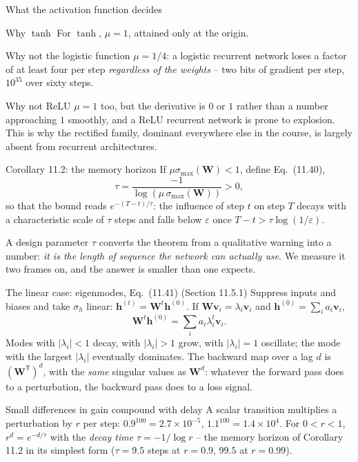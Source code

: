 \documentclass[10pt,aspectratio=169]{beamer}
\begin{document}
\begin{frame}{What the activation function decides}
\begin{block}{Why $\tanh$}
For $\tanh$, $\mu=1$, attained only at the origin.
\end{block}
\begin{block}{Why not the logistic function}
$\mu=1/4$: a logistic recurrent network loses a factor of at least four per
step \emph{regardless of the weights} -- two bits of gradient per step,
$10^{35}$ over sixty steps.
\end{block}
\begin{block}{Why not ReLU}
$\mu=1$ too, but the derivative is $0$ or $1$ rather than a number
approaching $1$ smoothly, and a ReLU recurrent network is prone to
explosion.  This is why the rectified family, dominant everywhere else in
the course, is largely absent from recurrent architectures.
\end{block}
\end{frame}

\begin{frame}{Corollary 11.2: the memory horizon}
If $\mu\sigma_{\max}(\bm{W})<1$, define Eq.~(11.40),
\[
  \tau=\frac{-1}{\log\!\left(\mu\,\sigma_{\max}(\bm{W})\right)}>0,
\]
so that the bound reads $e^{-(T-t)/\tau}$: the influence of step $t$ on
step $T$ decays with a characteristic scale of $\tau$ steps and falls below
$\varepsilon$ once $T-t>\tau\log(1/\varepsilon)$.

\medskip
\begin{block}{A design parameter}
$\tau$ converts the theorem from a qualitative warning into a number:
\emph{it is the length of sequence the network can actually use}.  We
measure it two frames on, and the answer is smaller than one expects.
\end{block}
\end{frame}

\begin{frame}{The linear case: eigenmodes, Eq.~(11.41) (Section 11.5.1)}
Suppress inputs and biases and take $\sigma_h$ linear: $\bm{h}^{(t)}=\bm{W}^t\bm{h}^{(0)}$.
If $\bm{W}\bm{v}_i=\lambda_i\bm{v}_i$ and $\bm{h}^{(0)}=\sum_ia_i\bm{v}_i$,
\[
  \boxed{\;\bm{W}^t\bm{h}^{(0)}=\sum_ia_i\lambda_i^{t}\bm{v}_i .\;}
\]
Modes with $|\lambda_i|<1$ decay, with $|\lambda_i|>1$ grow, with
$|\lambda_i|=1$ oscillate; the mode with the largest $|\lambda_i|$ eventually
dominates.  The backward map over a lag $d$ is $(\bm{W}^{\mathsf{T}})^d$,
with the \emph{same} singular values as $\bm{W}^d$: whatever the forward pass
does to a perturbation, the backward pass does to a loss signal.
\begin{block}{Small differences in gain compound with delay}
A scalar transition multiplies a perturbation by $r$ per step:
$0.9^{100}=2.7\times10^{-5}$, $1.1^{100}=1.4\times10^{4}$.  For $0<r<1$,
$r^d=e^{-d/\tau}$ with the \emph{decay time} $\tau=-1/\log r$ -- the memory
horizon of Corollary 11.2 in its simplest form ($\tau=9.5$ steps at
$r=0.9$, $99.5$ at $r=0.99$).
\end{block}
\end{frame}
\end{document}
